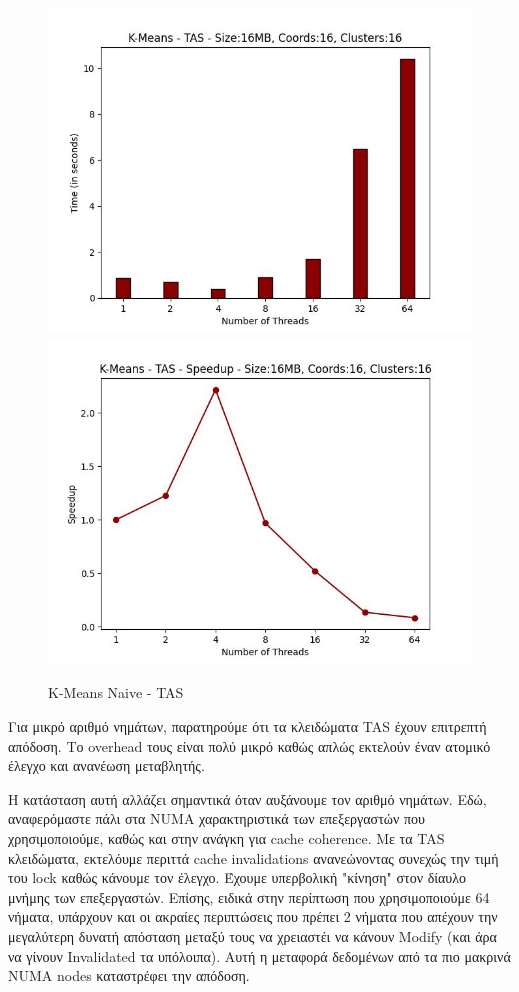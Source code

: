 \documentclass[../final_report.tex]{subfiles}
\begin{document}
\begin{figure}[H]
    \centering
        \includegraphics[scale=0.48]{outFilesAffinityMouliko/plots/kmeans_locks_tas.jpg}
        \includegraphics[scale=0.48]{outFilesAffinityMouliko/plots/kmeans_locks_tas_speedup.jpg}
    \caption{K-Means Naive - TAS}
    \label{fig:K-Means Naive - TAS}
\end{figure}


Για μικρό αριθμό νημάτων, παρατηρούμε ότι τα κλειδώματα TAS έχουν επιτρεπτή απόδοση.
Το overhead τους είναι πολύ μικρό καθώς απλώς εκτελούν έναν ατομικό έλεγχο και ανανέωση
μεταβλητής.

Η κατάσταση αυτή αλλάζει σημαντικά όταν αυξάνουμε τον αριθμό νημάτων. Εδώ, αναφερόμαστε πάλι
στα NUMA χαρακτηριστικά των επεξεργαστών που χρησιμοποιούμε, καθώς και στην ανάγκη για cache
coherence. Με τα TAS κλειδώματα, εκτελόυμε περιττά
cache invalidations ανανεώνοντας συνεχώς την τιμή του lock καθώς κάνουμε τον έλεγχο. Έχουμε 
υπερβολική "κίνηση" στον δίαυλο μνήμης των επεξεργαστών. Επίσης, ειδικά στην περίπτωση που 
χρησιμοποιούμε 64 νήματα, υπάρχουν και οι ακραίες περιπτώσεις που πρέπει 2 νήματα που απέχουν
την μεγαλύτερη δυνατή απόσταση μεταξύ τους να χρειαστέι να κάνουν Modify (και άρα να γίνουν Invalidated
τα υπόλοιπα). Αυτή η μεταφορά δεδομένων από τα πιο μακρινά NUMA nodes καταστρέφει την απόδοση.
\end{document}
